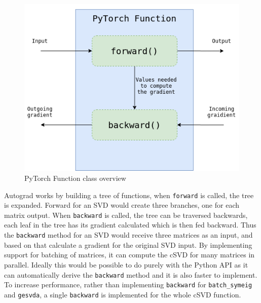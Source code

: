 \begin{figure}[H]
    \centering
    \includegraphics[scale=0.45]{Figures/pytorch_function.png}
    \caption{PyTorch Function class overview}
    \label{fig:pytorch:function}
\end{figure}

Autograd works by building a tree of functions, when \texttt{forward} is called, the tree is expanded. Forward for an SVD would create three branches, one for each matrix output. When \texttt{backward} is called, the tree can be traversed backwards, each leaf in the tree has its gradient calculated which is then fed backward. Thus the \texttt{backward} method for an SVD would receive three matrices as an input, and based on that calculate a gradient for the original SVD input. By implementing support for batching of matrices, it can compute the cSVD for many matrices in parallel. Ideally this would be possible to do purely with the Python API as it can automatically derive the \texttt{backward} method and it is also faster to implement. To increase performance, rather than implementing \texttt{backward} for \texttt{batch\_symeig} and \texttt{gesvda}, a single \texttt{backward} is implemented for the whole cSVD function.